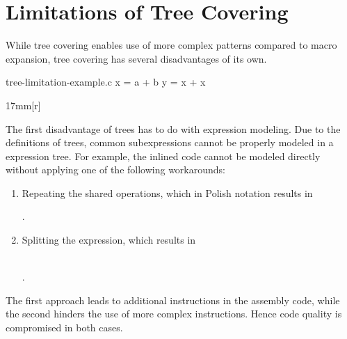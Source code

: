 \section{Limitations of Tree Covering}

While \gls{tree covering} enables use of more complex \glspl{pattern} compared
to \gls{macro expansion}, \gls{tree covering} has several disadvantages of its
own.

\begin{filecontents*}{tree-limitation-example.c}
x = a + b
y = x + x
\end{filecontents*}
%
\begin{inParFigure}{17mm}[r]
  \centering

  \vspace{1.25\baselineskip}

  \begin{lstpage}{\linewidth}%
  \end{lstpage}%
\end{inParFigure}%
%
The first disadvantage of \glspl{tree} has to do with expression modeling.
%
Due to the definitions of \glspl{tree}, common subexpressions cannot be properly
modeled in a \gls{expression tree}.
%
For example, the inlined code cannot be modeled directly without applying one of
the following workarounds:
%
\begin{enumerate}
  \item Repeating the shared operations, which in \gls{Polish notation} results
    in
    \begin{center}
      .
    \end{center}
  \item Splitting the expression, which results in
    \begin{center}
      \\
      .
    \end{center}
\end{enumerate}


\noindent
The first approach leads to additional \glspl{instruction} in the \gls{assembly
  code}, while the second hinders the use of more complex \glspl{instruction}.
%
Hence code quality is compromised in both cases.

